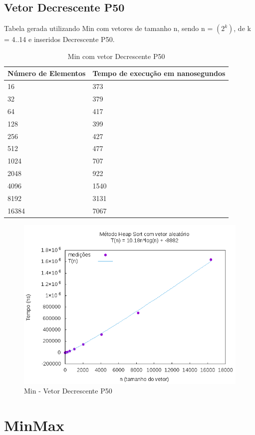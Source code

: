 \documentclass[12pt,a4paper,twoside]{report}
\begin{document}
\subsection{Vetor Decrescente P50}
Tabela gerada utilizando Min com vetores de tamanho n, sendo n = $(2^k)$, de k = 4..14 e inseridos Decrescente P50.
\begin{table}[H]
\centering
\caption{Min com vetor Decrescente P50}
\label{my-label}
\begin{tabular}{|l|l|}
\hline
\multicolumn{1}{|c|}{\textbf{Número de Elementos}} & \multicolumn{1}{c|}{\textbf{Tempo de execução em nanosegundos}} \\ \hline
16 & 373 \\ \hline
32 & 379 \\ \hline
64 & 417 \\ \hline
128 & 399 \\ \hline
256 & 427 \\ \hline
512 & 477 \\ \hline
1024 & 707 \\ \hline
2048 & 922 \\ \hline
4096 & 1540 \\ \hline
8192 & 3131 \\ \hline
16384 & 7067 \\ \hline
\end{tabular}
\end{table}

\begin{figure}[H]
    \centering
    \includegraphics[width=0.7\linewidth]{graficos/HeapSort/vIntAleatorio/vIntAleatorio.png}
  \caption{Min - Vetor Decrescente P50}
\end{figure}




\section{MinMax}
\end{document}
